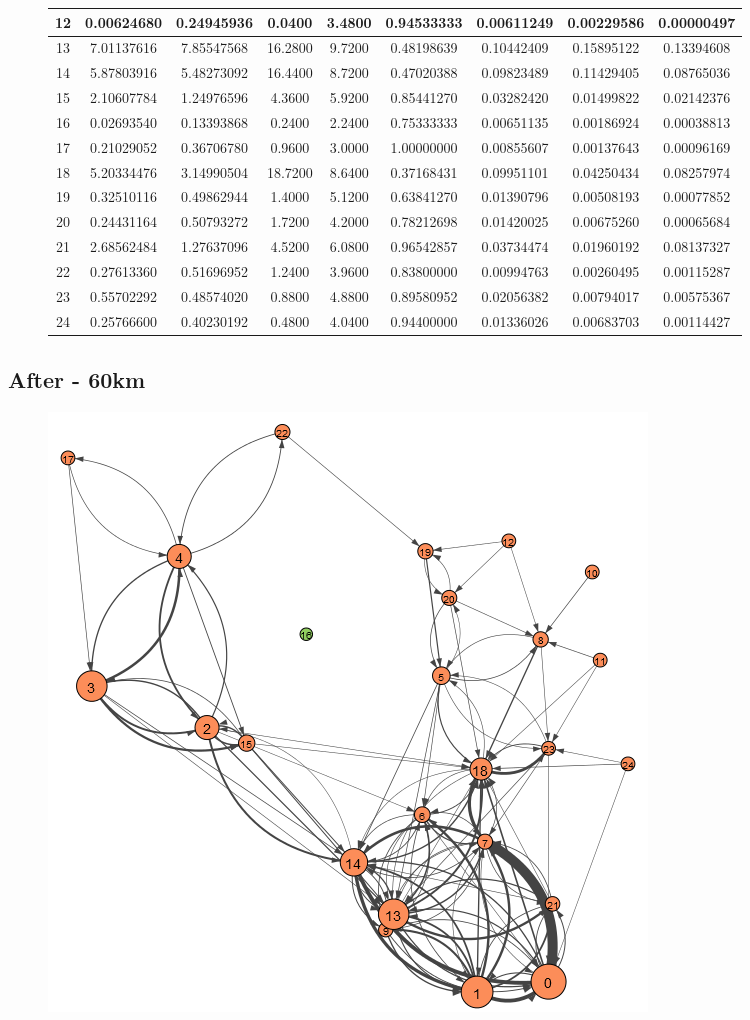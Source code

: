 \documentclass[12pt,a4paper]{thesis}
\begin{document}
\begin{figure}[H]
\begin{tabular}{|c|c|c|c|c|c|c|c|c|}
\hline	12	&	0.00624680	&	0.24945936	&	0.0400	&	3.4800	&	0.94533333	&	0.00611249	&	0.00229586	&	0.00000497	\\
\hline	13	&	7.01137616	&	7.85547568	&	16.2800	&	9.7200	&	0.48198639	&	0.10442409	&	0.15895122	&	0.13394608	\\
\hline	14	&	5.87803916	&	5.48273092	&	16.4400	&	8.7200	&	0.47020388	&	0.09823489	&	0.11429405	&	0.08765036	\\
\hline	15	&	2.10607784	&	1.24976596	&	4.3600	&	5.9200	&	0.85441270	&	0.03282420	&	0.01499822	&	0.02142376	\\
\hline	16	&	0.02693540	&	0.13393868	&	0.2400	&	2.2400	&	0.75333333	&	0.00651135	&	0.00186924	&	0.00038813	\\
\hline	17	&	0.21029052	&	0.36706780	&	0.9600	&	3.0000	&	1.00000000	&	0.00855607	&	0.00137643	&	0.00096169	\\
\hline	18	&	5.20334476	&	3.14990504	&	18.7200	&	8.6400	&	0.37168431	&	0.09951101	&	0.04250434	&	0.08257974	\\
\hline	19	&	0.32510116	&	0.49862944	&	1.4000	&	5.1200	&	0.63841270	&	0.01390796	&	0.00508193	&	0.00077852	\\
\hline	20	&	0.24431164	&	0.50793272	&	1.7200	&	4.2000	&	0.78212698	&	0.01420025	&	0.00675260	&	0.00065684	\\
\hline	21	&	2.68562484	&	1.27637096	&	4.5200	&	6.0800	&	0.96542857	&	0.03734474	&	0.01960192	&	0.08137327	\\
\hline	22	&	0.27613360	&	0.51696952	&	1.2400	&	3.9600	&	0.83800000	&	0.00994763	&	0.00260495	&	0.00115287	\\
\hline	23	&	0.55702292	&	0.48574020	&	0.8800	&	4.8800	&	0.89580952	&	0.02056382	&	0.00794017	&	0.00575367	\\
\hline	24	&	0.25766600	&	0.40230192	&	0.4800	&	4.0400	&	0.94400000	&	0.01336026	&	0.00683703	&	0.00114427	\\
\hline 
\end{tabular} 
\end{figure}



\subsection{After - 60km}

\begin{figure}[H]
\centering
\includegraphics[width=0.35\linewidth]{./AfterViz/ariadne60}
\caption{}
\label{fig:ariadneA60}
\end{figure}
\end{document}
